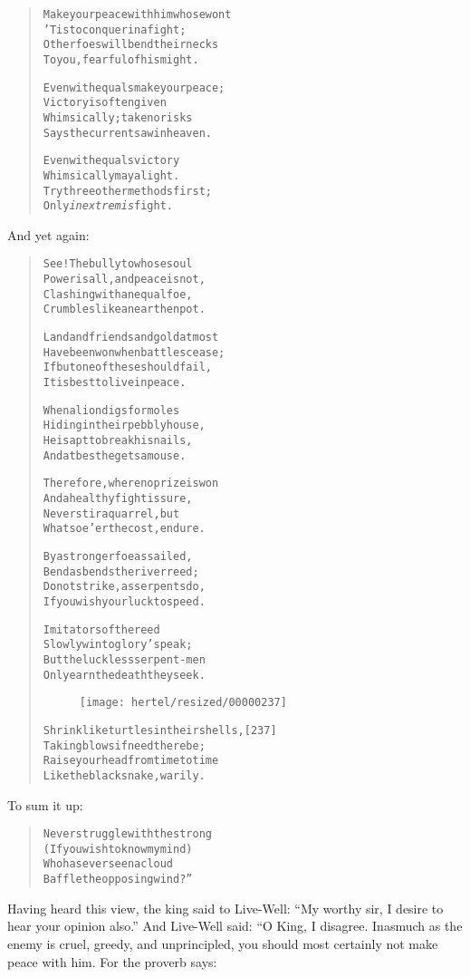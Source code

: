 \documentclass[article, twoside, 10pt]{memoir}
\renewenvironment{verbatim}{%
\begin{quote}%
\vskip -10pt%
\begin{alltt}\normalfont\small}{\end{alltt}%
\end{quote}%
\vskip -10pt
} %
\begin{document}
\begin{verbatim}
Make your peace with him whose wont
    'Tis to conquer in a fight;
Other foes will bend their necks
    To you, fearful of his might.

Even with equals make your peace;
    Victory is often given
Whimsically; take no risks{\textemdash}
    Says the current saw in heaven.

Even with equals victory
    Whimsically may alight.
Try three other methods first;
    Only \emph{in extremis} fight.
\end{verbatim}
And yet again:

\begin{verbatim}
See! The bully to whose soul
    Power is all, and peace is not,
Clashing with an equal foe,
    Crumbles like an earthen pot.

Land and friends and gold at most
    Have been won when battles cease;
If but one of these should fail,
    It is best to live in peace.

When a lion digs for moles
    Hiding in their pebbly house,
He is apt to break his nails,
    And at best he gets a mouse.

Therefore, where no prize is won
    And a healthy fight is sure,
Never stir a quarrel, but
    Whatsoe'er the cost, endure.

By a stronger foe assailed,
    Bend as bends the river reed;
Do not strike, as serpents do,
    If you wish your luck to speed.

Imitators of the reed
    Slowly win to glory's peak;
But the luckless serpent-men
    Only earn the death they seek.

\begin{figure}[p]\texttt{[image: hertel/resized/00000237]}\end{figure}Shrink like turtles in their shells,                    [237]
    Taking blows if need there be;
Raise your head from time to time
    Like the black snake, warily.
\end{verbatim}
To sum it up:

\begin{verbatim}
Never struggle with the strong
    (If you wish to know my mind)
Who has ever seen a cloud
    Baffle the opposing wind?”
\end{verbatim}
Having heard this view, the king said to Live-Well:
``My worthy sir, I desire to hear your opinion also.'' And
Live-Well said: “O King, I disagree. Inasmuch as the enemy is
cruel, greedy, and unprincipled, you should most certainly not make
peace with him. For the proverb says:
\end{document}
